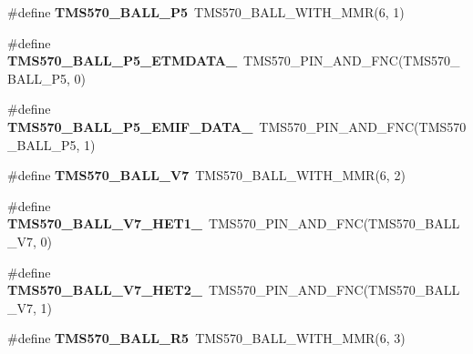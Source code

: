 \begin{DoxyCompactItemize}
\item 
\mbox{\label{tms570ls3137zwt-pins_8h_a8acb159c2faad0fc2993a4e944e5c9f6}} 
\#define {\bfseries T\+M\+S570\+\_\+\+B\+A\+L\+L\+\_\+\+P5}~T\+M\+S570\+\_\+\+B\+A\+L\+L\+\_\+\+W\+I\+T\+H\+\_\+\+M\+MR(6, 1)
\item 
\mbox{\label{tms570ls3137zwt-pins_8h_aa27d2bdc8305e2074e16a2f9698d8e56}} 
\#define {\bfseries T\+M\+S570\+\_\+\+B\+A\+L\+L\+\_\+\+P5\+\_\+\+E\+T\+M\+D\+A\+T\+A\+\_}~T\+M\+S570\+\_\+\+P\+I\+N\+\_\+\+A\+N\+D\+\_\+\+F\+NC(T\+M\+S570\+\_\+\+B\+A\+L\+L\+\_\+\+P5, 0)
\item 
\mbox{\label{tms570ls3137zwt-pins_8h_afbc192ce7f0848df50223fc646415f9c}} 
\#define {\bfseries T\+M\+S570\+\_\+\+B\+A\+L\+L\+\_\+\+P5\+\_\+\+E\+M\+I\+F\+\_\+\+D\+A\+T\+A\+\_}~T\+M\+S570\+\_\+\+P\+I\+N\+\_\+\+A\+N\+D\+\_\+\+F\+NC(T\+M\+S570\+\_\+\+B\+A\+L\+L\+\_\+\+P5, 1)
\item 
\mbox{\label{tms570ls3137zwt-pins_8h_a81c6f39120347735dbf0d2be1fe43841}} 
\#define {\bfseries T\+M\+S570\+\_\+\+B\+A\+L\+L\+\_\+\+V7}~T\+M\+S570\+\_\+\+B\+A\+L\+L\+\_\+\+W\+I\+T\+H\+\_\+\+M\+MR(6, 2)
\item 
\mbox{\label{tms570ls3137zwt-pins_8h_a51e3d049eacb5a81c35aca5d177e0ebb}} 
\#define {\bfseries T\+M\+S570\+\_\+\+B\+A\+L\+L\+\_\+\+V7\+\_\+\+H\+E\+T1\+\_}~T\+M\+S570\+\_\+\+P\+I\+N\+\_\+\+A\+N\+D\+\_\+\+F\+NC(T\+M\+S570\+\_\+\+B\+A\+L\+L\+\_\+\+V7, 0)
\item 
\mbox{\label{tms570ls3137zwt-pins_8h_a15216e8943489a2fc661fef477310037}} 
\#define {\bfseries T\+M\+S570\+\_\+\+B\+A\+L\+L\+\_\+\+V7\+\_\+\+H\+E\+T2\+\_}~T\+M\+S570\+\_\+\+P\+I\+N\+\_\+\+A\+N\+D\+\_\+\+F\+NC(T\+M\+S570\+\_\+\+B\+A\+L\+L\+\_\+\+V7, 1)
\item 
\mbox{\label{tms570ls3137zwt-pins_8h_aa369dda2adcaa59dedd07046ec3ff23a}} 
\#define {\bfseries T\+M\+S570\+\_\+\+B\+A\+L\+L\+\_\+\+R5}~T\+M\+S570\+\_\+\+B\+A\+L\+L\+\_\+\+W\+I\+T\+H\+\_\+\+M\+MR(6, 3)
\item 
\mbox{\label{tms570ls3137zwt-pins_8h_a737397d8aee82130951039e3d1be7605}} 

\end{DoxyCompactItemize}
